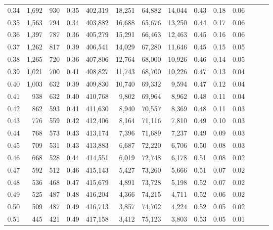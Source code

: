 \begin{tabular}{rrrrrrrrrrrrrr}
0.34 &   1,692 &    930 &  0.35 &  402,319 &   18,251 &  64,882 &  14,044 &  0.43 &  0.18 &      0.06 \\
0.35 &   1,563 &    794 &  0.34 &  403,882 &   16,688 &  65,676 &  13,250 &  0.44 &  0.17 &      0.06 \\
0.36 &   1,397 &    787 &  0.36 &  405,279 &   15,291 &  66,463 &  12,463 &  0.45 &  0.16 &      0.06 \\
0.37 &   1,262 &    817 &  0.39 &  406,541 &   14,029 &  67,280 &  11,646 &  0.45 &  0.15 &      0.05 \\
0.38 &   1,265 &    720 &  0.36 &  407,806 &   12,764 &  68,000 &  10,926 &  0.46 &  0.14 &      0.05 \\
0.39 &   1,021 &    700 &  0.41 &  408,827 &   11,743 &  68,700 &  10,226 &  0.47 &  0.13 &      0.04 \\
0.40 &   1,003 &    632 &  0.39 &  409,830 &   10,740 &  69,332 &   9,594 &  0.47 &  0.12 &      0.04 \\
0.41 &     938 &    632 &  0.40 &  410,768 &    9,802 &  69,964 &   8,962 &  0.48 &  0.11 &      0.04 \\
0.42 &     862 &    593 &  0.41 &  411,630 &    8,940 &  70,557 &   8,369 &  0.48 &  0.11 &      0.03 \\
0.43 &     776 &    559 &  0.42 &  412,406 &    8,164 &  71,116 &   7,810 &  0.49 &  0.10 &      0.03 \\
0.44 &     768 &    573 &  0.43 &  413,174 &    7,396 &  71,689 &   7,237 &  0.49 &  0.09 &      0.03 \\
0.45 &     709 &    531 &  0.43 &  413,883 &    6,687 &  72,220 &   6,706 &  0.50 &  0.08 &      0.03 \\
0.46 &     668 &    528 &  0.44 &  414,551 &    6,019 &  72,748 &   6,178 &  0.51 &  0.08 &      0.02 \\
0.47 &     592 &    512 &  0.46 &  415,143 &    5,427 &  73,260 &   5,666 &  0.51 &  0.07 &      0.02 \\
0.48 &     536 &    468 &  0.47 &  415,679 &    4,891 &  73,728 &   5,198 &  0.52 &  0.07 &      0.02 \\
0.49 &     525 &    487 &  0.48 &  416,204 &    4,366 &  74,215 &   4,711 &  0.52 &  0.06 &      0.02 \\
0.50 &     509 &    487 &  0.49 &  416,713 &    3,857 &  74,702 &   4,224 &  0.52 &  0.05 &      0.02 \\
0.51 &     445 &    421 &  0.49 &  417,158 &    3,412 &  75,123 &   3,803 &  0.53 &  0.05 &      0.01 \\

\end{tabular}
